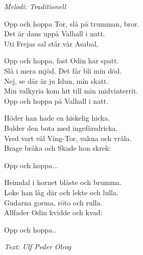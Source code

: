 {\footnotesize\textit{Melodi: Traditionell}}\par
\vspace{10pt}
Opp och hoppa Tor, slå på trumman, bror.\\
Det är dans uppå Valhall i natt.\\
Uti Frejas sal står vår Asabal,\par
\vspace{10pt}
Opp och hoppa, fast Odin har spatt.\\
Slå i mera mjöd. Det får bli min död.\\
Nej, se där är ju Idun, min skatt.\\
Min valkyria kom hit till min midvinterrit.\\
Opp och hoppa på Valhall i natt.\par
\vspace{10pt}
Höder han hade en hiskelig hicka.\\
Balder den bota med ingefärsdricka.\\
Vred vart väl Ving-Tor, vakna och vråla.\\
Brage bråka och Skade hon skrek:\par
\newpage
Opp och hoppa...\par
\vspace{10pt}
Heimdal i hornet blåste och brumma.\\
Loke han låg där och lekte och lulla.\\
Gudarna gorma, röto och rulla.\\
Allfader Odin kvidde och kvad:\par
\vspace{10pt}
Opp och hoppa..
\par
\vspace{10pt}
{\footnotesize\textit{Text: Ulf Peder Olrog}}
